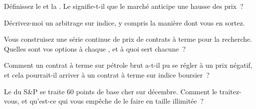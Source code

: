 \begin{interviewq}\label{iq:m1:basis-roll-and-delivery:2}
Définissez le  et la . Le  signifie-t-il que le marché anticipe
une hausse des prix~?
\end{interviewq}

\begin{interviewq}\label{iq:m1:basis-roll-and-delivery:3}
Décrivez-moi un arbitrage sur indice, y compris la manière dont vous en sortez.
\end{interviewq}

\begin{interviewq}\label{iq:m1:basis-roll-and-delivery:4}
Vous construisez une série continue de prix de contrats à terme pour la recherche. Quelles sont
vos options à chaque , et à quoi sert chacune~?
\end{interviewq}

\begin{interviewq}\label{iq:m1:basis-roll-and-delivery:5}
Comment un contrat à terme sur pétrole brut a-t-il pu se régler à un prix négatif, et cela pourrait-il arriver
à un contrat à terme sur indice boursier~?
\end{interviewq}

\begin{interviewq}\label{iq:m1:basis-roll-and-delivery:6}
Le  du S\&P se traite 60 points de base cher sur décembre. Comment le traitez-vous, et
qu'est-ce qui vous empêche de le faire en taille illimitée~?
\end{interviewq}
